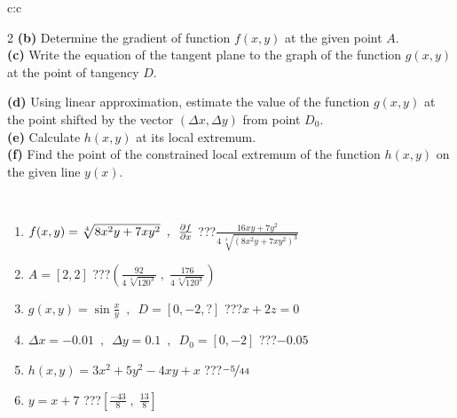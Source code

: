 \documentclass[10pt]{report}
\begin{document}
\begin{tabular}{c:c}
\begin{minipage}[c][104.5mm][t]{0.5\linewidth}
\begin{center}
\begin{minipage}{0.95\linewidth}
\begin{center}
{\begin{multicols}{2}
\textbf{(b)} Determine the gradient of function \(f(x,y)\) at the given point \(A\). \\[1mm]
\textbf{(c)} Write the equation of the tangent plane to the graph of the function \(g(x,y)\) at the point of tangency \(D\). \par \columnbreak
\textbf{(d)} Using linear approximation, estimate the value of the function \(g(x,y)\) at the point shifted by the vector \((\Delta x, \Delta y)\) from point \(D_0\). \\[1mm]
\textbf{(e)} Calculate \(h(x,y)\) at its local extremum. \\[1mm]
\textbf{(f)} Find the point of the constrained local extremum of the function \(h(x,y)\) on the given line \(y(x)\). \\[1mm]
\end{multicols}
}
\end{center}
\end{minipage}
\\[4mm]
\begin{minipage}{0.79\linewidth}
\begin{center}
\begin{varwidth}{\linewidth}
\begin{enumerate}
\normalsizerr
\item $f(x,y) = \sqrt[4]{8x^2y + 7xy^2}\enspace , \enspace \pdv{f}{x}$\quad \dotfill\; ???\;\dotfill \quad $\frac{16xy+7y^2}{4\,\sqrt[4]{(8x^2y+7xy^2)^{3}}}$
\item $A = [2, 2]$\quad \dotfill\; ???\;\dotfill \quad $\left( \frac{92}{4\,\sqrt[4]{120^3}} \;,\; \frac{176}{4\,\sqrt[4]{120^3}} \right)$
\item $g(x,y) = \sin\frac{x}{y} \enspace , \enspace D = [0, -2, ?]$\quad \dotfill\; ???\;\dotfill \quad $x+2z=0$
\item $\Delta x = {-0.01} \enspace,\enspace \Delta y = {0.1} \enspace,\enspace D_0 = [0,-2]$\quad \dotfill\; ???\;\dotfill \quad $-0.05$
\item $h(x,y) = 3x^2+5y^2-4xy+x$\quad \dotfill\; ???\;\dotfill \quad $\nicefrac{-5}{44}$
\item $y = x+7$\quad \dotfill\; ???\;\dotfill \quad $\left[\frac{-43}{8}\;,\;\frac{13}{8}\right]$
\end{enumerate}
\end{varwidth}
\end{center}
\end{minipage}
\begin{minipage}{0.20\linewidth}
\begin{center}

\end{center}
\end{minipage}
\end{center}
\end{minipage}
\end{tabular}
\end{document}
